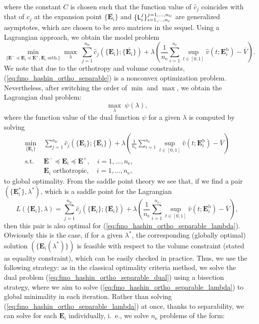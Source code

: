 \documentclass[preprint,3p]{elsarticle}
\newcommand{\tensf}[1]{\bm{\mathbf{#1}}}            %
\newcommand{\Ei}{\tensf{E}_i}                       %
\newcommand{\Emin}{\tensf{E}^{-}}                   %
\newcommand{\Emax}{\tensf{E}^{+}}                   %
\newcommand{\nel}{n_\mathrm{e}}                     %
\newcommand{\nlc}{n_\mathrm{lc}}                    %
\newcommand{\semtrx}[1]{\ifcat\noexpand#1\relax\bm{#1}\else\mathsf{#1}\fi}
\begin{document}
%
where the constant $C$ is chosen such that the function value of $\hat{c}_j$ coincides with that of $c_j$ at the expansion point $\{\overline{\Ei}\}$ and $\{\semtrx{L}_i^j\}_{i=1,\ldots,\nel}^{j=1,\ldots,\nlc}$ are generalized asymptotes, which are chosen to be zero matrices in the sequel. Using a Lagrangian approach, we obtain the model problem
%
\begin{equation}\label{eq:fmo_hashin_ortho_separable}
    \min_{\{\Emin \preceq \Ei \preceq \Emax,\Ei \text{ orth.}\}} \max_{\lambda}\; \sum_{j=1}^{\nlc} \hat{c}_j\left(\{\Ei\};\{\overline{\Ei}\}\right) + \lambda\left( \frac{1}{\nel}\sum_{i=1}^{\nel} \sup_{t \in [0,1]} \hat{v}(t;\Ei^{\mathrm{b}}) - \overline{V}\right).
\end{equation}
%
We note that due to the orthotropy and volume constraints, (\ref{eq:fmo_hashin_ortho_separable}) is a nonconvex optimization problem. Nevertheless, after switching the order of $\min$ and $\max$, we obtain the Lagrangian dual problem:
%
\begin{equation}\label{eq:fmo_hashin_ortho_separable_dual}
    \max_{\lambda}\; \psi(\lambda),
\end{equation}
%
where the function value of the dual function $\psi$ for a given $\lambda$ is computed by solving 
%
\begin{subequations}\label{eq:fmo_hashin_ortho_separable_lambda}
\begin{align}
    \min_{\{\Ei\}}\; & \sum_{j=1}^{\nlc} \hat{c}_j\left(\{\Ei\};\{\overline{\Ei}\}\right) + \lambda\left( \frac{1}{\nel}\sum_{i=1}^{\nel} \sup_{t \in [0,1]} \hat{v}(t;\Ei^{\mathrm{b}}) - \overline{V}\right) \\
    \mathrm{s.t.} \; & \Emin \preceq \Ei \preceq \Emax,\quad i = 1,\dots,\nel,\\
    & \Ei \text{ orthotropic},\quad i = 1,\dots,\nel,
\end{align}
\end{subequations}
%
to global optimality. From the saddle point theory we see that, if we find a pair $(\{\Ei^*\},\lambda^*)$, which is a saddle point for the Lagrangian
%
$$
L(\{\Ei\},\lambda) = \sum_{j=1}^{\nlc} \hat{c}_j\left(\{\Ei\};\{\overline{\Ei}\}\right) + \lambda\left( \frac{1}{\nel}\sum_{i=1}^{\nel} \sup_{t \in [0,1]} \hat{v}(t;\Ei^{\mathrm{b}}) - \overline{V}\right),
$$
%
then this pair is also optimal for (\ref{eq:fmo_hashin_ortho_separable_lambda}). Obviously this is the case, if for a given $\lambda^*$, the corresponding (globally optimal) solution $(\{\Ei(\lambda^*)\})$ is feasible with respect to the volume constraint (stated as equality constraint), which can be easily checked in practice. Thus, we use the following strategy: as in the classical optimality criteria method, we solve the dual problem (\ref{eq:fmo_hashin_ortho_separable_dual}) using a bisection strategy, where we aim to solve (\ref{eq:fmo_hashin_ortho_separable_lambda}) to global minimality in each iteration. Rather than solving (\ref{eq:fmo_hashin_ortho_separable_lambda}) at once, thanks to separability, we can solve for each $\Ei$ individually, i.~e., we solve $\nel$ problems of the form:
\end{document}
